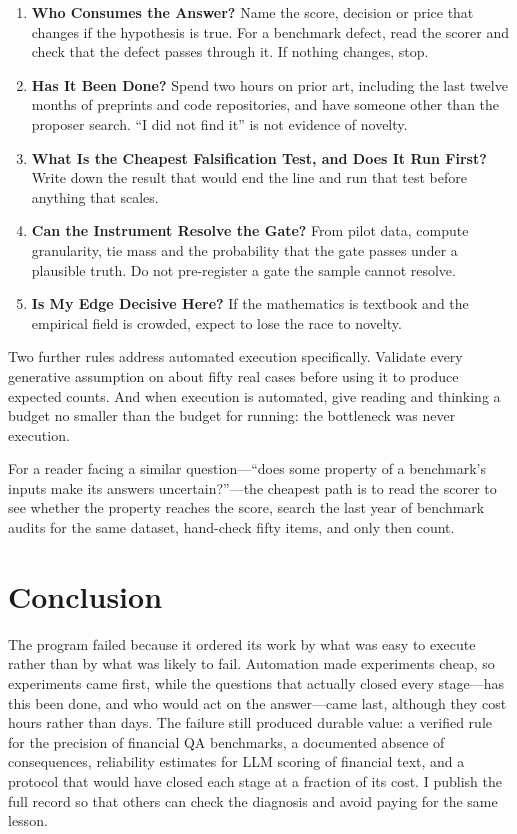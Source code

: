 \documentclass[11pt]{article}
\begin{document}
\begin{enumerate}[leftmargin=1.3em]
\item \textbf{Who Consumes the Answer?} Name the score, decision or price that changes if the hypothesis is true. For a benchmark defect, read the scorer and check that the defect passes through it. If nothing changes, stop.
\item \textbf{Has It Been Done?} Spend two hours on prior art, including the last twelve months of preprints and code repositories, and have someone other than the proposer search. ``I did not find it'' is not evidence of novelty.
\item \textbf{What Is the Cheapest Falsification Test, and Does It Run First?} Write down the result that would end the line and run that test before anything that scales.
\item \textbf{Can the Instrument Resolve the Gate?} From pilot data, compute granularity, tie mass and the probability that the gate passes under a plausible truth. Do not pre-register a gate the sample cannot resolve.
\item \textbf{Is My Edge Decisive Here?} If the mathematics is textbook and the empirical field is crowded, expect to lose the race to novelty.
\end{enumerate}

Two further rules address automated execution specifically. Validate every generative assumption on about fifty real cases before using it to produce expected counts. And when execution is automated, give reading and thinking a budget no smaller than the budget for running: the bottleneck was never execution.

For a reader facing a similar question---``does some property of a benchmark's inputs make its answers uncertain?''---the cheapest path is to read the scorer to see whether the property reaches the score, search the last year of benchmark audits for the same dataset, hand-check fifty items, and only then count.

\section{Conclusion}

The program failed because it ordered its work by what was easy to execute rather than by what was likely to fail. Automation made experiments cheap, so experiments came first, while the questions that actually closed every stage---has this been done, and who would act on the answer---came last, although they cost hours rather than days. The failure still produced durable value: a verified rule for the precision of financial QA benchmarks, a documented absence of consequences, reliability estimates for LLM scoring of financial text, and a protocol that would have closed each stage at a fraction of its cost. I publish the full record so that others can check the diagnosis and avoid paying for the same lesson.
\end{document}
